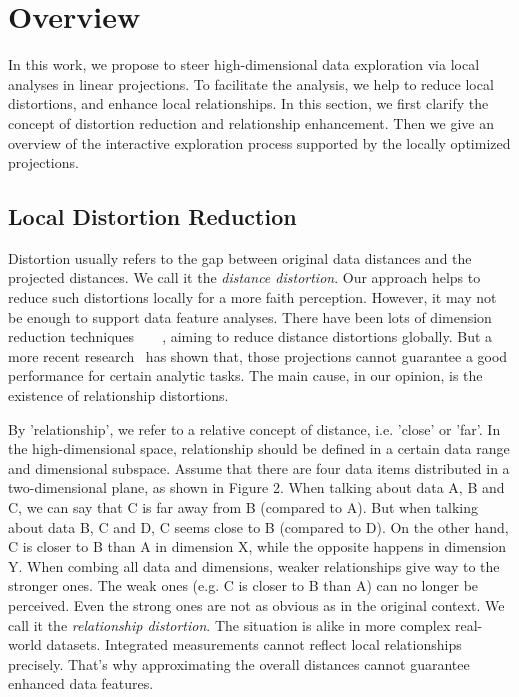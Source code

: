 \section{Overview}
\label{section:overview}
In this work, we propose to steer high-dimensional data exploration via local analyses in linear projections. To facilitate the analysis, we help to reduce local distortions, and enhance local relationships. In this section, we first clarify the concept of distortion reduction and relationship enhancement. Then we give an overview of the interactive exploration process supported by the locally optimized projections.

\subsection{Local Distortion Reduction}
Distortion usually refers to the gap between original data distances and the projected distances. We call it the \emph{distance distortion}. Our approach helps to reduce such distortions locally for a more faith perception. However, it may not be enough to support data feature analyses. There have been lots of dimension reduction techniques~\cite{jolliffe2002principal}~\cite{borg2005modern}~\cite{tenenbaum2000global}~\cite{roweis2000nonlinear}, aiming to reduce distance distortions globally. But a more recent research~\cite{DBLP:journals/tvcg/EtemadpourMPMOL15} has shown that, those projections cannot guarantee a good performance for certain analytic tasks. The main cause, in our opinion, is the existence of relationship distortions.

By 'relationship', we refer to a relative concept of distance, i.e. 'close' or 'far'. In the high-dimensional space, relationship should be defined in a certain data range and dimensional subspace. Assume that there are four data items distributed in a two-dimensional plane, as shown in Figure 2.  When talking about data A, B and C, we can say that C is far away from B (compared to A). But when talking about data B, C and D, C seems close to B (compared to D). On the other hand, C is closer to B than A in dimension X, while the opposite happens in dimension Y. When combing all data and dimensions, weaker relationships give way to the stronger ones. The weak ones (e.g. C is closer to B than A) can no longer be perceived. Even the strong ones are not as obvious as in the original context. We call it the \emph{relationship distortion}. The situation is alike in more complex real-world datasets. Integrated measurements cannot reflect local relationships precisely. That's why approximating the overall distances cannot guarantee enhanced data features.

